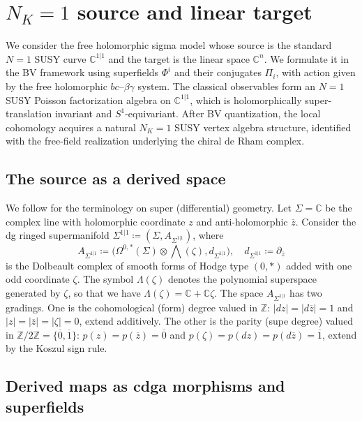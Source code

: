 \documentclass[final,reqno]{amsart}
\numberwithin{equation}{section}
\theoremstyle{definition}
\newcommand{\ol}{\overline}
\newcommand{\ceq}{\coloneqq} %
\newcommand{\bbC}{\mathbb{C}}
\newcommand{\bbZ}{\mathbb{Z}}
\newcommand{\sC}{\mathbb{C}^{1|1}}
\newcommand{\ev}{\ol{0}}
\newcommand{\od}{\ol{1}}
\newcommand{\Zt}{\bbZ/2\bbZ}
\newcommand{\pd}{\partial}
\newcommand{\sSig}{\Sigma^{1|1}}
\newcommand{\abs}[1]{\left| #1 \right|}
\DeclareMathOperator{\Wedge}{{\textstyle\bigwedge}}
\begin{document}
\section{\texorpdfstring{$N_K=1$}{$N=1$} source and linear target}
\label{s:2}

We consider the free holomorphic sigma model 
whose source is the standard $N=1$ SUSY curve $\sC$
and the target is the linear space $\bbC^{n}$.
We formulate it in the BV framework 
using superfields $\Phi^i$ and their conjugates $\Pi_i$,
with action given by the free holomorphic $bc$--$\beta\gamma$ system.
The classical observables form an $N=1$ SUSY Poisson factorization algebra 
on $\sC$, which is holomorphically super-translation invariant
and $S^{1}$-equivariant. 
After BV quantization, the local cohomology acquires a natural $N_{K}=1$ 
SUSY vertex algebra structure, identified with the free-field realization 
underlying the chiral de Rham complex.

\subsection{The source as a derived space}\label{ss:2.1}

We follow \cite[Part 1, Chap.\ 2--3]{D+} 
for the terminology on super (differential) geometry.
Let $\Sigma = \bbC$ be the complex line with holomorphic coordinate $z$
and anti-holomorphic $\ol{z}$. 
Consider the dg ringed supermanifold $\sSig \ceq (\Sigma,A_{\sSig})$, where 
\[
 A_{\sSig} \ceq 
 \bigl(\Omega^{0,*}(\Sigma) \otimes \Wedge(\zeta),d_{\sSig}\bigr), 
 \quad 
 d_{\sSig} \ceq \pd_{\ol{z}}
\]
is the Dolbeault complex of smooth forms of Hodge type $(0,*)$ 
added with one odd coordinate $\zeta$.
The symbol $\Lambda(\zeta)$ denotes 
the polynomial superspace generated by $\zeta$,
so that we have $\Lambda(\zeta)=\bbC+\bbC\zeta$.
The space $A_{\sSig}$ has two gradings. 
One is the cohomological (form) degree valued in $\bbZ$: 
$\abs{dz} = \abs{d\ol{z}} = 1$ and $\abs{z}=\abs{\ol{z}}=\abs{\zeta}=0$,
extend additively.
The other is the parity (supe degree) valued in $\Zt=\{\ev,\od\}$: 
$p(z)=p(\ol{z})=\ev$ and $p(\zeta)=p(dz)=p(d\ol{z})=\od$, 
extend by the Koszul sign rule.

\subsection{Derived maps as cdga morphisms and superfields}
\end{document}

